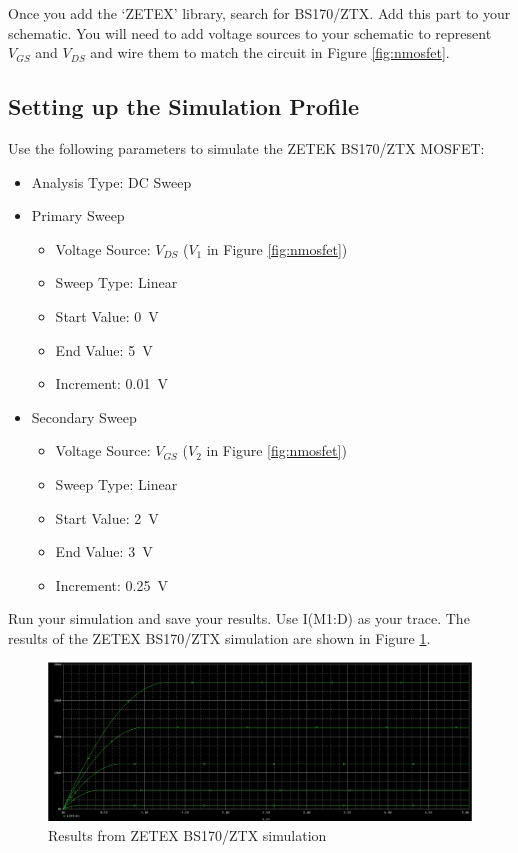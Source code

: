 \documentclass[12pt]{../manual}
\begin{document}
Once you add the `ZETEX’ library, search for BS170/ZTX. Add this part to your schematic. You will need to add voltage sources to your schematic to represent $V_{GS}$ and $V_{DS}$ and wire them to match the circuit in Figure \ref{fig:nmosfet}.

\newpage
\subsection{Setting up the Simulation Profile}
Use the following parameters to simulate the ZETEK BS170/ZTX MOSFET:
\begin{itemize}
\item Analysis Type: DC Sweep
\item Primary Sweep
\begin{itemize}
\item Voltage Source: $V_{DS}$ ($V_1$ in Figure \ref{fig:nmosfet}) 
\item Sweep Type: Linear
\item Start Value: \SI{0}{\volt}
\item End Value: \SI{5}{\volt}
\item Increment: \SI{0.01}{\volt} 
\end{itemize}
\item Secondary Sweep
\begin{itemize}
\item Voltage Source: $V_{GS}$ ($V_2$ in Figure \ref{fig:nmosfet}) 
\item Sweep Type: Linear
\item Start Value: \SI{2}{\volt}
\item End Value: \SI{3}{\volt}
\item Increment: \SI{0.25}{\volt}
\end{itemize}
\end{itemize}


Run your simulation and save your results. Use I(M1:D) as your trace. The results of the ZETEX BS170/ZTX simulation are shown in Figure \ref{fig:zetexsim}.

\begin{figure}[ht!]
\begin{center}
\includegraphics[width=\textwidth]{figures/simulationBase}
\end{center}
\caption{Results from ZETEX BS170/ZTX simulation}
\label{fig:zetexsim}
\end{figure}
\end{document}
